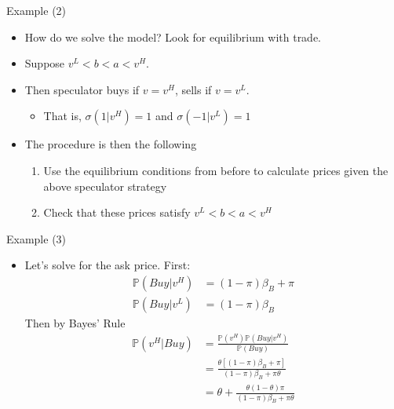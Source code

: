 \documentclass[english,10pt]{beamer}
\begin{document}
\begin{frame}{Example (2)}
	\begin{itemize}
		\item How do we solve the model? Look for equilibrium with trade. 
		\item Suppose $v^L < b < a < v^H$.
		\item Then speculator buys if $v=v^H$, sells if $v=v^L$. 
		\begin{itemize}
			\item That is, $\sigma(1|v^H)=1$ and $\sigma(-1|v^L)=1$
		\end{itemize}
		\item The procedure is then the following
		\begin{enumerate}
			\item Use the equilibrium conditions from before to calculate prices given the above speculator strategy
			\item Check that these prices satisfy $v^L < b < a < v^H$
		\end{enumerate}
	\end{itemize}
\end{frame}


\begin{frame}{Example (3)}
\begin{itemize}
	\item Let's solve for the ask price. First:
	\begin{align*}
		\mathbb{P}(Buy| v^H) & = (1-\pi) \beta_B + \pi \\
		\mathbb{P}(Buy| v^L) & = (1-\pi) \beta_B
	\end{align*}
	Then by Bayes' Rule
	\begin{align*}
		\mathbb{P}(v^H|Buy) & = \frac{\mathbb{P}(v^H) \mathbb{P}(Buy| v^H)}{\mathbb{P}(Buy)}  \\
		& = \frac{\theta [(1-\pi)\beta_B+\pi]}{(1-\pi)\beta_B+ \pi\theta}  \\
		& =  \theta + \frac{\theta(1-\theta) \pi}{(1-\pi)\beta_B+\pi\theta}
	\end{align*}
\end{itemize}
\end{frame}
\end{document}
